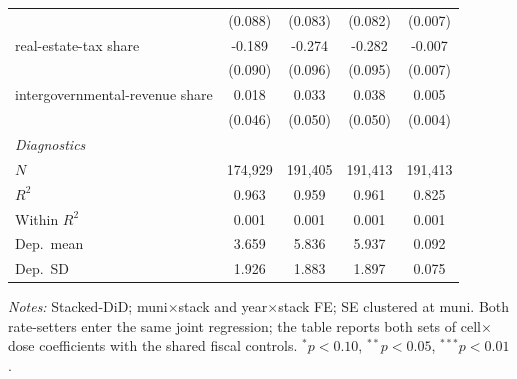 \begin{table}[!htbp]
{\begin{tabular}{lcccc}
                      & (0.088) & (0.083) & (0.082) & (0.007) \\
    real-estate-tax share & -0.189\sym{**} & -0.274\sym{***} & -0.282\sym{***} & -0.007 \\
                      & (0.090) & (0.096) & (0.095) & (0.007) \\
    intergovernmental-revenue share & 0.018 & 0.033 & 0.038 & 0.005 \\
                      & (0.046) & (0.050) & (0.050) & (0.004) \\
    \midrule
    \multicolumn{5}{l}{\textit{Diagnostics}} \\
    $N$           & 174,929 & 191,405 & 191,413 & 191,413 \\
    $R^2$         & 0.963 & 0.959 & 0.961 & 0.825 \\
    Within $R^2$  & 0.001 & 0.001 & 0.001 & 0.001 \\
    Dep.\ mean    & 3.659 & 5.836 & 5.937 & 0.092 \\
    Dep.\ SD      & 1.926 & 1.883 & 1.897 & 0.075 \\
    \bottomrule
  \end{tabular}
  }
  \vspace{0.3em}
  \begin{minipage}{0.95\textwidth}
    \footnotesize \textit{Notes:} Stacked-DiD; muni$\times$stack and year$\times$stack FE; SE clustered at muni. Both rate-setters enter the same joint regression; the table reports both sets of cell$\times$dose coefficients with the shared fiscal controls. $^{*}p<0.10$, $^{**}p<0.05$, $^{***}p<0.01$.
  \end{minipage}
\end{table}
